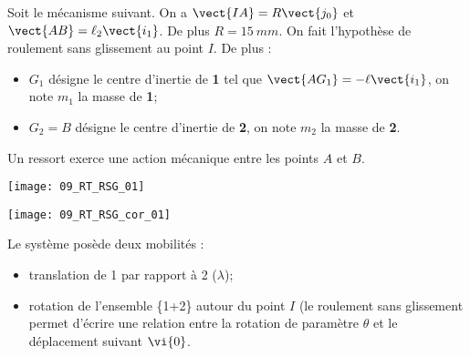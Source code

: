 \normalfalse \difficiletrue \tdifficilefalse
\correctiontrue

\setcounter{question}{0}%
\ifcorrection
\else
{}
\fi

\ifprof
\else
Soit le mécanisme suivant. On a $\vect{IA}=R\vect{j_0}$ et $\vect{AB}=\ell_2\vect{i_1}$. De plus $R=\SI{15}{mm}$.
On fait l'hypothèse de roulement sans glissement au point $I$. De plus :
\begin{itemize}
\item $G_1$ désigne le centre d'inertie de \textbf{1} tel que $\vect{AG_1}=-\ell\vect{i_1}$, on note $m_1$ la masse de \textbf{1};%
\item $G_2=B$ désigne le centre d'inertie de \textbf{2}, on note $m_2$ la masse de \textbf{2}.%
\end{itemize}
Un ressort exerce une action mécanique entre les points $A$ et $B$. 
\begin{marginfigure}
\texttt{[image: 09\_RT\_RSG\_01]}
\end{marginfigure}
\fi

\ifprof
\begin{marginfigure}
\texttt{[image: 09\_RT\_RSG\_cor\_01]}
\end{marginfigure}

\else
\fi

\ifprof
Le système posède deux mobilités : 
\begin{itemize}
\item translation de 1 par rapport à 2 ($\lambda$);
\item rotation de l'ensemble \{1+2\} autour du point $I$ (le roulement sans glissement permet d'écrire une relation entre la rotation de paramètre $\theta$ et le déplacement suivant $\vi{0}$.
\end{itemize}

